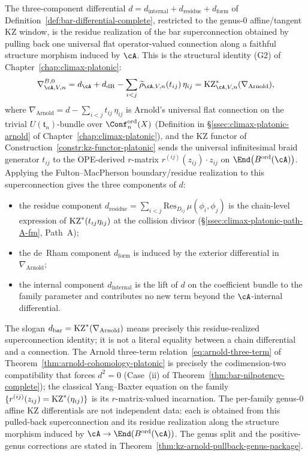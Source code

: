 \begin{remark}
\label{rem:dbar-as-kz-pullback}
%
%
The three-component differential
$d = d_{\mathrm{internal}} + d_{\mathrm{residue}} + d_{\mathrm{form}}$ of
Definition~\ref{def:bar-differential-complete}, restricted to the
genus-$0$ affine/tangent KZ window, is the residue realization of the
bar superconnection obtained by pulling back one universal flat
operator-valued connection along a faithful structure morphism induced
by \(\cA\). This is the structural identity \textup{(}G2\textup{)} of
Chapter~\ref{chap:climax-platonic}:
\[
\nabla^{B,0}_{\cA,V,n}
=d_\cA+d_{\mathrm{dR}}
-\sum_{i<j}\widetilde\rho_{\cA,V,n}(t_{ij})\,\eta_{ij}
=\KZ_{\cA,V,n}^{*}(\nabla_{\mathrm{Arnold}}),
\]
where $\nabla_{\mathrm{Arnold}} = d - \sum_{i<j} t_{ij}\,\eta_{ij}$ is
Arnold's universal flat connection on the trivial
$U(\mathfrak{t}_n)$-bundle over $\Conf_n^{\mathrm{ord}}(X)$
\textup{(}Definition in
\S\ref{ssec:climax-platonic-arnold} of
Chapter~\ref{chap:climax-platonic}\textup{)}, and
the KZ functor of
Construction~\ref{constr:kz-functor-platonic} sends the universal
infinitesimal braid generator $t_{ij}$ to the OPE-derived
$r$-matrix $r^{(ij)}(z_{ij})\cdot z_{ij}$ on
$\End\bigl(B^{\mathrm{ord}}(\cA)\bigr)$. Applying the
Fulton--MacPherson boundary/residue realization to this
superconnection gives the three components of \(d\):
\begin{itemize}
\item the residue component
$d_{\mathrm{residue}} = \sum_{i<j} \mathrm{Res}_{D_{ij}}\,\mu(\phi_i,\phi_j)$
is the chain-level expression of $\mathrm{KZ}^{*}(t_{ij}\eta_{ij})$ at the
collision divisor (\S\ref{ssec:climax-platonic-path-A-fm}, Path~A);
\item the de~Rham component $d_{\mathrm{form}}$ is induced by the
exterior differential in $\nabla_{\mathrm{Arnold}}$;
\item the internal component $d_{\mathrm{internal}}$ is the lift of
$d$ on the coefficient bundle to the family parameter and contributes
no new term beyond the $\cA$-internal differential.
\end{itemize}
The slogan \(d_{\mathrm{bar}}=\mathrm{KZ}^*(\nabla_{\mathrm{Arnold}})\)
means precisely this residue-realized superconnection identity; it is
not a literal equality between a chain differential and a connection.
The Arnold three-term relation~\eqref{eq:arnold-three-term} of
Theorem~\ref{thm:arnold-cohomology-platonic} is precisely
the codimension-two compatibility that forces $d^2 = 0$
\textup{(}Case~(ii) of Theorem~\ref{thm:bar-nilpotency-complete}\textup{)};
the classical Yang--Baxter equation on the family
$\{r^{(ij)}(z_{ij}) = \mathrm{KZ}^{*}(\eta_{ij})\}$ is its $r$-matrix-valued
incarnation. The per-family genus-$0$ affine KZ differentials are not
independent data: each is obtained from this pulled-back
superconnection and its residue realization along the structure
morphism induced by \(\cA \to \End(B^{\mathrm{ord}}(\cA))\). The genus
split and the positive-genus corrections are stated in
Theorem~\ref{thm:kz-arnold-pullback-genus-package}.
\end{remark}

